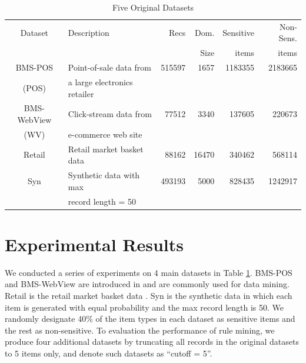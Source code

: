 \begin{table}[tb]
\small
\centering
\caption{Five Original Datasets}
\begin{tabular}{|c|l|r|r|r|r|} \hline
Dataset	& Description & Recs & Dom. & Sensitive & Non-Sens.\\
& & & Size & items & items  \\ \hline \hline
BMS-POS &Point-of-sale data from &515597 & 1657&1183355 &  2183665\\
(POS)	& a large electronics retailer   &	&	&	& \\ \hline
BMS-WebView &Click-stream data from &77512 & 3340& 137605 & 220673  \\
(WV) & e-commerce web site  & &  & & \\ \hline
Retail &  Retail market basket data   & 88162&16470 &340462 & 568114  \\ \hline
Syn & Synthetic data with max & 493193 &5000 &828435 & 1242917 \\
 & record length = 50   & & & & \\ \hline
\end{tabular}
\label{tab:datasets}
\end{table}

\section{Experimental Results}
\label{sec:eval}

We conducted a series of experiments on
4 main datasets in Table \ref{tab:datasets}. BMS-POS and BMS-WebView are
introduced in \cite{Zheng:2001:RWP:502512.502572} and are commonly used for
data mining. Retail is the retail market basket data \cite{brijs99:retailData}. Syn is the synthetic data in which each item is generated with 
equal probability and the max record length is 50.
We randomly designate 40\% of the item types in each dataset as
sensitive items and the rest as non-sensitive.
To evaluation the performance of rule mining,
we produce four additional datasets by truncating all records in the
original datasets to 5 items only, and denote
such datasets as ``cutoff = 5''.

